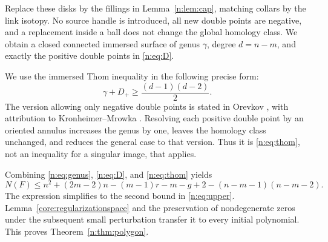 \documentclass[UTF8,11pt]{ctexart}
\theoremstyle{definition}
\numberwithin{equation}{section}
\begin{document}
Replace these disks by the fillings in Lemma~\ref{n:lem:cap}, matching collars
by the link isotopy. No source handle is introduced, all new double points
are negative, and a replacement inside a ball does not change the global
homology class. We obtain a closed connected immersed surface of genus
$\gamma$, degree $d=n-m$, and exactly the positive double points in
\eqref{n:eq:D}.

We use the immersed Thom inequality in the following precise form:
\begin{equation}\label{n:eq:thom}
 \gamma+D_+\ge\frac{(d-1)(d-2)}2.
\end{equation}
The version allowing only negative double points is stated in Orevkov
\cite[Theorem~3.1, author version v2, p.~8]{Ore24}, with attribution to
Kronheimer--Mrowka \cite{KM94}. Resolving each positive double point by an
oriented annulus increases the genus by one, leaves the homology class
unchanged, and reduces the general case to that version. Thus it is
\eqref{n:eq:thom}, not an inequality for a singular image, that applies.

Combining \eqref{n:eq:genus}, \eqref{n:eq:D}, and \eqref{n:eq:thom} yields
\[
 N(F)\le n^2+(2m-2)n-(m-1)r-m-g+2
       -(n-m-1)(n-m-2).
\]
The expression simplifies to the second bound in \eqref{n:eq:upper}.
Lemma~\ref{core:regularizationspace} and the preservation of nondegenerate zeros under the
subsequent small perturbation transfer it to every initial polynomial.
This proves Theorem~\ref{n:thm:polygon}.
\end{document}
